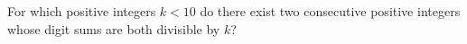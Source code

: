 For which positive integers $k<10$ do there exist two consecutive positive integers whose digit sums are both divisible by $k$?
